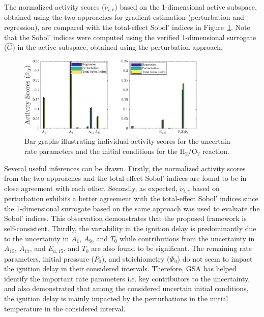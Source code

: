The normalized activity scores ($\tilde{\nu}_{i,r}$) based on the 1-dimensional active subspace, obtained
using the two approaches for gradient estimation (perturbation and regression),
are compared with the 
total-effect Sobol' indices
in Figure~\ref{fig:as_36D}. Note that the Sobol' indices were computed using the verified
1-dimensional surrogate ($\hat{G}$) in the active subspace, obtained using the 
perturbation approach. 
%
\begin{figure}[htbp]
 \begin{center}
  \includegraphics[width=0.8\textwidth]{as_36Dp2}
\caption{Bar graphs illustrating individual activity scores for the uncertain 
rate parameters and the initial conditions for the H$_2$/O$_2$ reaction.}
\label{fig:as_36D}
\end{center}
\end{figure}
%
Several useful inferences can be drawn. Firstly, the normalized activity scores from the two approaches
and the total-effect Sobol' indices are found to be in close agreement with each other. Secondly, as expected, 
$\tilde{\nu}_{i,r}$ based on perturbation exhibits a better agreement with the total-effect Sobol' indices since
the 1-dimensional
surrogate based on the same approach was used to evaluate the Sobol' indices. This observation demonstrates
that the proposed framework is self-consistent. Thirdly, the variability in the ignition delay is predominantly due
to the uncertainty in $A_1$, $A_9$, and $T_0$ while contributions from the uncertainty in $A_{15}$, $A_{17}$, and
$E_{a,15}$, and $T_0$ are also found to be significant. The remaining rate parameters, initial pressure ($P_0$),
and  stoichiometry ($\Phi_0$) do not seem to impact the ignition delay in their considered intervals. 
Therefore, GSA has helped
identify the important rate parameters i.e. key contributors to the uncertainty, and also demonstrated that among the 
considered uncertain initial conditions, the ignition delay is mainly impacted by the perturbations in the initial 
temperature in the considered interval.
